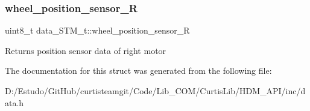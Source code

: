 \subsubsection{\texorpdfstring{wheel\+\_\+position\+\_\+sensor\+\_\+R}{wheel\_position\_sensor\_R}}
{\footnotesize\ttfamily uint8\+\_\+t data\+\_\+\+S\+T\+M\+\_\+t\+::wheel\+\_\+position\+\_\+sensor\+\_\+R}

Returns position sensor data of right motor 

The documentation for this struct was generated from the following file\+:\begin{DoxyCompactItemize}
\item 
D\+:/\+Estudo/\+Git\+Hub/curtisteamgit/\+Code/\+Lib\+\_\+\+C\+O\+M/\+Curtis\+Lib/\+H\+D\+M\+\_\+\+A\+P\+I/inc/data.\+h\end{DoxyCompactItemize}

